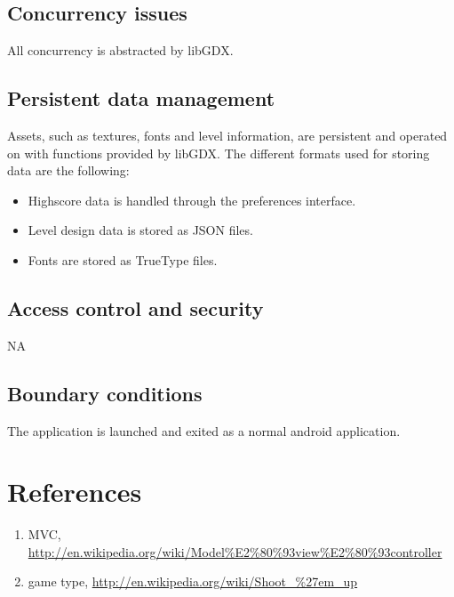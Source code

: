 \documentclass{article}
\begin{document}
\subsection{Concurrency issues}
All concurrency is abstracted by libGDX.

\subsection{Persistent data management}
Assets, such as textures, fonts and level information, are persistent and operated on with functions provided by libGDX. The different formats used for storing data are the following: 
\begin{itemize}
  \item Highscore data is handled through the preferences interface.
  \item Level design data is stored as JSON files.
  \item Fonts are stored as TrueType files.
\end{itemize}

\subsection{Access control and security}
NA


\subsection{Boundary conditions}
The application is launched and exited as a normal android application.

\section{References}
\begin{enumerate}
  \item MVC, \url{http://en.wikipedia.org/wiki/Model%E2%80%93view%E2%80%93controller}
  \item game type, \url{http://en.wikipedia.org/wiki/Shoot_%27em_up}
\end{enumerate}
\end{document}
